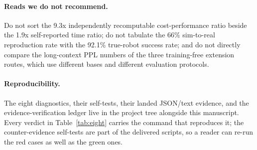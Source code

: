 \paragraph{Reads we do not recommend.} Do not sort the 9.3x independently
recomputable cost-performance ratio beside the 1.9x self-reported time ratio; do
not tabulate the 66\% sim-to-real reproduction rate with the 92.1\% true-robot
success rate; and do not directly compare the long-context PPL numbers of the
three training-free extension routes, which use different bases and different
evaluation protocols.

\paragraph{Reproducibility.} The eight diagnostics, their self-tests, their
landed JSON/text evidence, and the evidence-verification ledger live in the
project tree alongside this manuscript. Every verdict in Table~\ref{tab:eight}
carries the command that reproduces it; the counter-evidence self-tests are part
of the delivered scripts, so a reader can re-run the red cases as well as the
green ones.